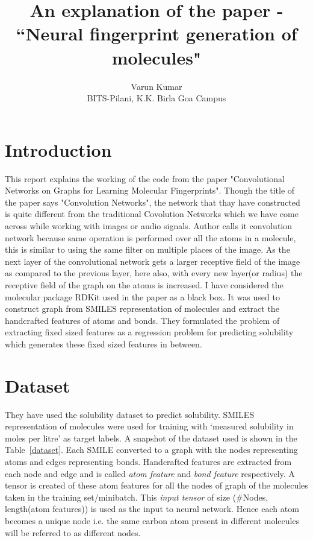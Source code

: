 \documentclass[11pt,a4paper]{report}
\begin{document}
\title{An explanation of the paper -\\``Neural fingerprint generation of molecules"}
\author{Varun Kumar\\ BITS-Pilani, K.K. Birla Goa Campus}
\maketitle
\tableofcontents
\pagebreak

\section{Introduction}
This report explains the working of the code from the paper "Convolutional Networks on Graphs for Learning Molecular Fingerprints". Though the title of the paper says "Convolution Networks", the network that thay have constructed is quite different from the traditional Covolution Networks which we have come across while working with images or audio signals. Author calls it convolution network because same operation is performed over all the atoms in a molecule, this is similar to using the same filter on multiple places of the image. As the next layer of the convolutional network gets a larger receptive field of the image as compared to the previous layer, here also, with every new layer(or radius) the receptive field of the graph on the atoms is increased. I have considered the molecular package RDKit used in the paper as a black box. It was used to construct graph from SMILES representation of molecules and extract the handcrafted features of atoms and bonds. They formulated the problem of extracting fixed sized features as a regression problem for predicting solubility which generates these fixed sized features in between.

\section{Dataset}
They have used the solubility dataset \citep{delaney2004esol} to predict solubility. SMILES representation of molecules were used for training with `measured solubility in moles per litre' as target labels. A snapshot of the dataset used is shown in the Table~\ref{dataset}.
Each SMILE converted to a graph with the nodes representing atoms and edges representing bonds. Handcrafted features are extracted from each node and edge and is called \textit{atom feature} and \textit{bond feature} respectively. A tensor is created of these atom features for all the nodes of graph of the molecules taken in the training set/minibatch. This \textit{input tensor} of size (\#Nodes, length(atom features)) is used as the input to neural network. Hence each atom becomes a unique node i.e. the same carbon atom present in different molecules will be referred to as different nodes.
\end{document}
